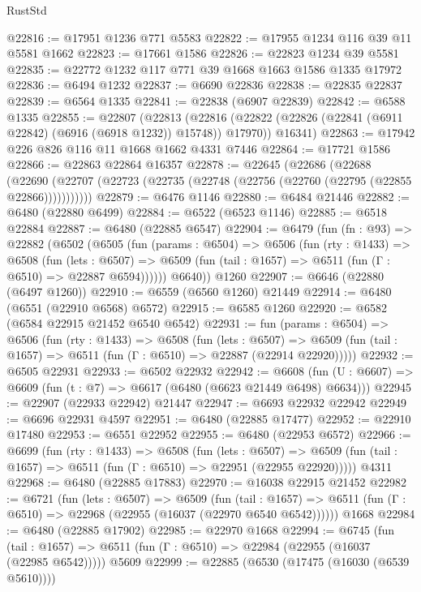 \begin{lexlean}{RustStd}
\begin{coremodule}
@22816 := @17951 @1236 @771 @5583
@22822 := @17955 @1234 @116 @39 @11 @5581 @1662
@22823 := @17661 @1586
@22826 := @22823 @1234 @39 @5581
@22835 := @22772 @1232 @117 @771 @39 @1668 @1663 @1586 @1335 @17972
@22836 := @6494 @1232
@22837 := @6690 @22836
@22838 := @22835 @22837
@22839 := @6564 @1335
@22841 := @22838 (@6907 @22839)
@22842 := @6588 @1335
@22855 := @22807
    (@22813
      (@22816 (@22822 (@22826 (@22841 (@6911 @22842) (@6916 (@6918 @1232)) @15748)) @17970))
      @16341)
@22863 := @17942 @226 @826 @116 @11 @1668 @1662 @4331 @7446
@22864 := @17721 @1586
@22866 := @22863 @22864 @16357
@22878 := @22645
    (@22686
      (@22688
        (@22690 (@22707 (@22723 (@22735 (@22748 (@22756 (@22760 (@22795 (@22855 @22866)))))))))))
@22879 := @6476 @1146
@22880 := @6484 @21446
@22882 := @6480 (@22880 @6499)
@22884 := @6522 (@6523 @1146)
@22885 := @6518 @22884
@22887 := @6480 (@22885 @6547)
@22904 := @6479
    (fun (fn : @93) =>
    @22882
      (@6502
        (@6505
          (fun (params : @6504) =>
          @6506
            (fun (rty : @1433) =>
            @6508
              (fun (lets : @6507) =>
              @6509 (fun (tail : @1657) => @6511 (fun (Γ : @6510) => @22887 @6594))))))
        @6640))
    @1260
@22907 := @6646 (@22880 (@6497 @1260))
@22910 := @6559 (@6560 @1260) @21449
@22914 := @6480 (@6551 (@22910 @6568) @6572)
@22915 := @6585 @1260
@22920 := @6582 (@6584 @22915 @21452 @6540 @6542)
@22931 := fun (params : @6504) =>
  @6506
    (fun (rty : @1433) =>
    @6508
      (fun (lets : @6507) =>
      @6509 (fun (tail : @1657) => @6511 (fun (Γ : @6510) => @22887 (@22914 @22920)))))
@22932 := @6505 @22931
@22933 := @6502 @22932
@22942 := @6608
    (fun (U : @6607) => @6609 (fun (t : @7) => @6617 (@6480 (@6623 @21449 @6498) @6634)))
@22945 := @22907 (@22933 @22942) @21447
@22947 := @6693 @22932 @22942
@22949 := @6696 @22931 @4597
@22951 := @6480 (@22885 @17477)
@22952 := @22910 @17480
@22953 := @6551 @22952
@22955 := @6480 (@22953 @6572)
@22966 := @6699
    (fun (rty : @1433) =>
    @6508
      (fun (lets : @6507) =>
      @6509 (fun (tail : @1657) => @6511 (fun (Γ : @6510) => @22951 (@22955 @22920)))))
    @4311
@22968 := @6480 (@22885 @17883)
@22970 := @16038 @22915 @21452
@22982 := @6721
    (fun (lets : @6507) =>
    @6509
      (fun (tail : @1657) =>
      @6511 (fun (Γ : @6510) => @22968 (@22955 (@16037 (@22970 @6540 @6542))))))
    @1668
@22984 := @6480 (@22885 @17902)
@22985 := @22970 @1668
@22994 := @6745
    (fun (tail : @1657) => @6511 (fun (Γ : @6510) => @22984 (@22955 (@16037 (@22985 @6542)))))
    @5609
@22999 := @22885 (@6530 (@17475 (@16030 (@6539 @5610))))

\end{coremodule}
\end{lexlean}
